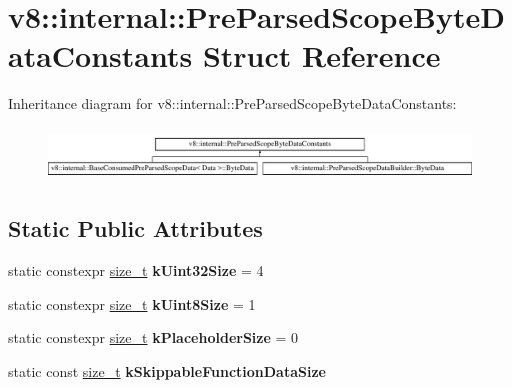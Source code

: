\hypertarget{structv8_1_1internal_1_1PreParsedScopeByteDataConstants}{}\section{v8\+:\+:internal\+:\+:Pre\+Parsed\+Scope\+Byte\+Data\+Constants Struct Reference}
\label{structv8_1_1internal_1_1PreParsedScopeByteDataConstants}
Inheritance diagram for v8\+:\+:internal\+:\+:Pre\+Parsed\+Scope\+Byte\+Data\+Constants\+:\begin{figure}[H]
\begin{center}
\leavevmode
\includegraphics[height=1.386139cm]{structv8_1_1internal_1_1PreParsedScopeByteDataConstants}
\end{center}
\end{figure}
\subsection*{Static Public Attributes}
\begin{DoxyCompactItemize}
\item 
\mbox{\label{structv8_1_1internal_1_1PreParsedScopeByteDataConstants_a0215c029a979ce2b5c22f192ea974432}} 
static constexpr \mbox{\hyperlink{classsize__t}{size\+\_\+t}} {\bfseries k\+Uint32\+Size} = 4
\item 
\mbox{\label{structv8_1_1internal_1_1PreParsedScopeByteDataConstants_a3b2f166fdaa44d1cbb09bcff36111bad}} 
static constexpr \mbox{\hyperlink{classsize__t}{size\+\_\+t}} {\bfseries k\+Uint8\+Size} = 1
\item 
\mbox{\label{structv8_1_1internal_1_1PreParsedScopeByteDataConstants_af124d474b97ec69682a8e19fabeac73e}} 
static constexpr \mbox{\hyperlink{classsize__t}{size\+\_\+t}} {\bfseries k\+Placeholder\+Size} = 0
\item 
static const \mbox{\hyperlink{classsize__t}{size\+\_\+t}} {\bfseries k\+Skippable\+Function\+Data\+Size}
\end{DoxyCompactItemize}


